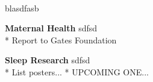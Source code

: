  \\
blasdfasb
\begin{itemize*}
  \item\leftandright
    {\textbf{Maternal Health}}
    {\small{sdfsd}} \\  
    * Report to Gates Foundation
  \item\leftandright
    {\textbf{Sleep Research}}
    {\small{sdfsd}} \\  
    * List posters...
    * UPCOMING ONE...
\end{itemize*}
